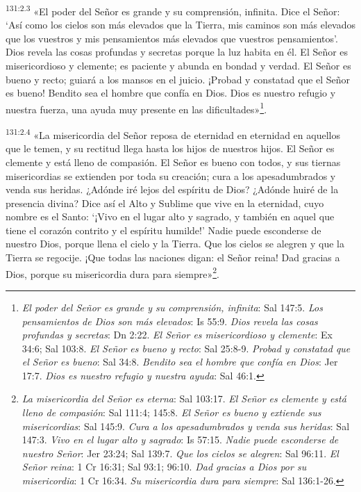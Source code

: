 \par 
\textsuperscript{131:2.3} «El poder del Señor es grande y su comprensión, infinita. Dice el Señor: `Así como los cielos son más elevados que la Tierra, mis caminos son más elevados que los vuestros y mis pensamientos más elevados que vuestros pensamientos'. Dios revela las cosas profundas y secretas porque la luz habita en él. El Señor es misericordioso y clemente; es paciente y abunda en bondad y verdad. El Señor es bueno y recto; guiará a los mansos en el juicio. ¡Probad y constatad que el Señor es bueno! Bendito sea el hombre que confía en Dios. Dios es nuestro refugio y nuestra fuerza, una ayuda muy presente en las dificultades»\footnote{\textit{El poder del Señor es grande y su comprensión, infinita}: Sal 147:5. \textit{Los pensamientos de Dios son más elevados}: Is 55:9. \textit{Dios revela las cosas profundas y secretas}: Dn 2:22. \textit{El Señor es misericordioso y clemente}: Ex 34:6; Sal 103:8. \textit{El Señor es bueno y recto}: Sal 25:8-9. \textit{Probad y constatad que el Señor es bueno}: Sal 34:8. \textit{Bendito sea el hombre que confía en Dios}: Jer 17:7. \textit{Dios es nuestro refugio y nuestra ayuda}: Sal 46:1.}.

\par 
\textsuperscript{131:2.4} «La misericordia del Señor reposa de eternidad en eternidad en aquellos que le temen, y su rectitud llega hasta los hijos de nuestros hijos. El Señor es clemente y está lleno de compasión. El Señor es bueno con todos, y sus tiernas misericordias se extienden por toda su creación; cura a los apesadumbrados y venda sus heridas. ¿Adónde iré lejos del espíritu de Dios? ¿Adónde huiré de la presencia divina? Dice así el Alto y Sublime que vive en la eternidad, cuyo nombre es el Santo: `¡Vivo en el lugar alto y sagrado, y también en aquel que tiene el corazón contrito y el espíritu humilde!' Nadie puede esconderse de nuestro Dios, porque llena el cielo y la Tierra. Que los cielos se alegren y que la Tierra se regocije. ¡Que todas las naciones digan: el Señor reina! Dad gracias a Dios, porque su misericordia dura para siempre»\footnote{\textit{La misericordia del Señor es eterna}: Sal 103:17. \textit{El Señor es clemente y está lleno de compasión}: Sal 111:4; 145:8. \textit{El Señor es bueno y extiende sus misericordias}: Sal 145:9. \textit{Cura a los apesadumbrados y venda sus heridas}: Sal 147:3. \textit{Vivo en el lugar alto y sagrado}: Is 57:15. \textit{Nadie puede esconderse de nuestro Señor}: Jer 23:24; Sal 139:7. \textit{Que los cielos se alegren}: Sal 96:11. \textit{El Señor reina}: 1 Cr 16:31; Sal 93:1; 96:10. \textit{Dad gracias a Dios por su misericordia}: 1 Cr 16:34. \textit{Su misericordia dura para siempre}: Sal 136:1-26.}.

